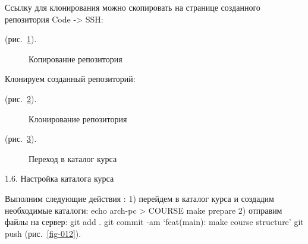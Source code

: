 \documentclass[
  english,
  russian,
  12pt,
  a4paper,
  DIV=11,
  numbers=noendperiod]{scrreprt}
\begin{document}
Ссылку для клонирования можно скопировать на странице созданного
репозитория Code -\textgreater{} SSH:

(рис.~\ref{fig-009}).

\begin{figure}


\caption{\label{fig-009}Копирование репозитория}

\end{figure}%

Клонируем созданный репозиторий:

(рис.~\ref{fig-010}).

\begin{figure}


\caption{\label{fig-010}Клонирование репозитория}

\end{figure}%

(рис.~\ref{fig-011}).

\begin{figure}


\caption{\label{fig-011}Переход в каталог курса}

\end{figure}%

1.6. Настройка каталога курса

Выполним следующие действия : 1) перейдем в каталог курса и создадим
необходимые каталоги: echo arch-pc \textgreater{} COURSE make prepare 2)
отправим файлы на сервер: git add . git commit -am \enquote*{feat(main):
make course structure} git push (рис.~\ref{fig-012}).
\end{document}
